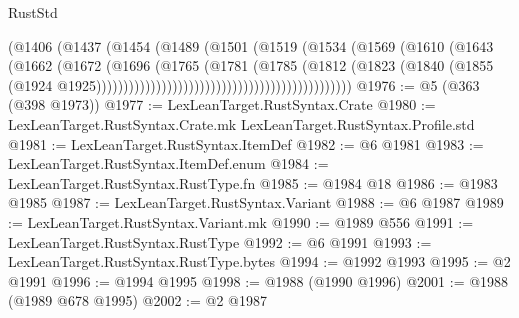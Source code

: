 \begin{lexlean}{RustStd}
\begin{coremodule}
                                                        (@1406
                                                          (@1437
                                                            (@1454
                                                              (@1489
                                                                (@1501
                                                                  (@1519
                                                                    (@1534
                                                                      (@1569
                                                                        (@1610
                                                                          (@1643
                                                                            (@1662
                                                                              (@1672
                                                                                (@1696
                                                                                  (@1765
                                                                                    (@1781
                                                                                      (@1785
                                                                                        (@1812
                                                                                          (@1823
                                                                                            (@1840
                                                                                              (@1855
                                                                                                (@1924
                                                                                                  @1925)))))))))))))))))))))))))))))))))))))))))))))))
@1976 := @5 (@363 (@398 @1973))
@1977 := LexLeanTarget.RustSyntax.Crate
@1980 := LexLeanTarget.RustSyntax.Crate.mk LexLeanTarget.RustSyntax.Profile.std
@1981 := LexLeanTarget.RustSyntax.ItemDef
@1982 := @6 @1981
@1983 := LexLeanTarget.RustSyntax.ItemDef.enum
@1984 := LexLeanTarget.RustSyntax.RustType.fn
@1985 := @1984 @18
@1986 := @1983 @1985
@1987 := LexLeanTarget.RustSyntax.Variant
@1988 := @6 @1987
@1989 := LexLeanTarget.RustSyntax.Variant.mk
@1990 := @1989 @556
@1991 := LexLeanTarget.RustSyntax.RustType
@1992 := @6 @1991
@1993 := LexLeanTarget.RustSyntax.RustType.bytes
@1994 := @1992 @1993
@1995 := @2 @1991
@1996 := @1994 @1995
@1998 := @1988 (@1990 @1996)
@2001 := @1988 (@1989 @678 @1995)
@2002 := @2 @1987

\end{coremodule}
\end{lexlean}

